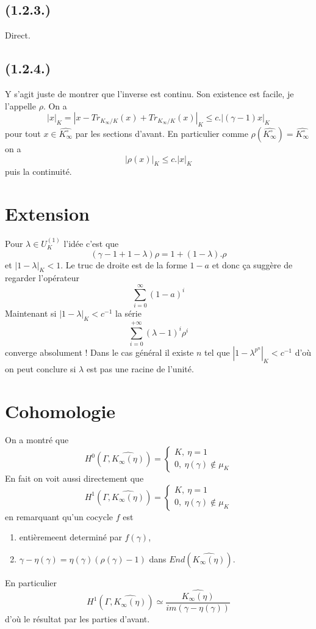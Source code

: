 \documentclass[a4paper,12pt]{article}
\theoremstyle{plain}
\theoremstyle{definition}
\theoremstyle{remark}
\begin{document}
\subsection{(1.2.3.)}
Direct.
\subsection{(1.2.4.)}
Y s'agit juste de montrer que l'inverse est continu. Son
existence est facile, je l'appelle $\rho$. On a 
\[|x|_K=|x-Tr_{K_\infty/K}(x)+Tr_{K_\infty/K}(x)|_K\leq c.|(\gamma-1)x|_K\]
pour tout $x\in \widehat{K_\infty^\circ}$ par les
sections d'avant. En 
particulier comme 
$\rho(\widehat{K_\infty^\circ})=\widehat{K_\infty^\circ}$
on a
\[|\rho(x)|_K\leq c.|x|_K\]
puis la continuité.


\section{Extension}
Pour $\lambda\in U_K^{(1)}$ l'idée c'est que
\[(\gamma-1+1-\lambda)\rho=1+(1-\lambda).\rho\]
et $|1-\lambda|_K<1$. Le truc de droite est de la
forme $1-a$ et donc ça suggère de regarder l'opérateur
\[\sum_{i=0}^\infty (1-a)^i\]
Maintenant si $|1-\lambda|_K<c^{-1}$ la série
\[\sum_{i=0}^{+\infty} (\lambda-1)^i\rho^i\]
converge absolument ! Dans le cas général
il existe $n$ tel que $|1-\lambda^{p^n}|_K<c^{-1}$
d'où on peut conclure si $\lambda$ est pas une
racine de l'unité.

\section{Cohomologie}
On a montré que 
\[H^0(\Gamma, \widehat{K_\infty(\eta)})=\begin{cases} K,~\eta=1\\0,~\eta(\gamma)\notin \mu_K\end{cases}\]
En fait on voit aussi directement que
\[H^1(\Gamma, \widehat{K_\infty(\eta)})=\begin{cases} K,~\eta=1\\0,~\eta(\gamma)\notin \mu_K\end{cases}\]
en remarquant qu'un cocycle $f$ est 
\begin{enumerate}
  \item entièremeent determiné par $f(\gamma)$,
  \item $\gamma-\eta(\gamma)=\eta(\gamma)(\rho(\gamma)-1)$ dans $End(\widehat{K_\infty(\eta)})$.
\end{enumerate}
En particulier 
\[H^1(\Gamma,\widehat{K_\infty(\eta)})\simeq \frac{\widehat{K_\infty(\eta)}}{im(\gamma-\eta(\gamma))}\]
d'où le résultat par les parties d'avant.
\end{document}

